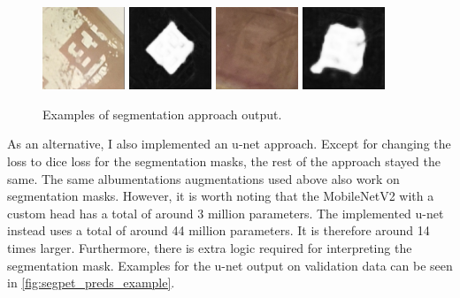 \documentclass[10pt]{book}
\newcommand{\figureref}[1]{\autoref{#1}}
\begin{document}
\begin{figure}
  \centering
     {\includegraphics[width=0.22\textwidth]{image/segpet_1_in}}
     {\includegraphics[width=0.22\textwidth]{image/segpet_1_pred}}
     {\includegraphics[width=0.22\textwidth]{image/segpet_3_in}}
     {\includegraphics[width=0.22\textwidth]{image/segpet_3_pred}}
  \caption{Examples of segmentation approach output.}
  \label{fig:segpet_preds_example}
\end{figure}

As an alternative, I also implemented an u-net approach. Except for changing the loss to dice loss for the segmentation masks, the rest of the approach stayed the same. The same albumentations augmentations used above also work on segmentation masks. However, it is worth noting that the MobileNetV2 with a custom head has a total of around 3 million parameters. The implemented u-net instead uses a total of around 44 million parameters. It is therefore around 14 times larger. Furthermore, there is extra logic required for interpreting the segmentation mask. 
Examples for the u-net output on validation data can be seen in \figureref{fig:segpet_preds_example}. 
\end{document}
